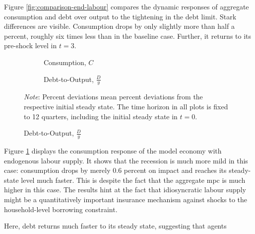 \documentclass[12pt]{article} %
\numberwithin{equation}{section} %
\numberwithin{figure}{section}
\numberwithin{table}{section}
\begin{document}
Figure \ref{fig:comparison-end-labour} compares the dynamic responses of aggregate consumption and debt over output to the tightening in the debt limit. Stark differences are visible. Consumption drops by only slightly more than half a percent, roughly six times less than in the baseline case. Further, it returns to its pre-shock level in $t=3$.

\begin{figure}[ht]
    \caption{Endogenous Labour Supply -- Shock to the Borrowing Limit: Aggregate Dynamics}
    \label{fig:comparison-end-labour}
    \centering
    \begin{subfigure}[b]{0.49\textwidth}
    \caption{Consumption, $C$}
    \label{fig:comparison-end-labour-c}
         \centering
         
     \end{subfigure}
     \hfill
    \begin{subfigure}[b]{0.49\textwidth}
    \caption{Debt-to-Output, $\frac{D}{y}$}
    \label{fig:comparison-end-labour-DY}
         \centering
         
     \end{subfigure}
     
     \vspace{10pt}
     
     \justifying
     \footnotesize
	\textit{Note}: Percent deviations mean percent deviations from the respective initial steady state. The time horizon in all plots is fixed to 12 quarters, including the initial steady state in $t=0$.
\end{figure}

Figure \ref{fig:comparison-end-labour-c} displays the consumption response of the model economy with endogenous labour supply. It shows that the recession is much more mild in this case: consumption drops by merely $0.6$ percent on impact and reaches its steady-state level much faster. This is despite the fact that the aggregate \Gls{mpc} is much higher in this case. The results hint at the fact that idiosyncratic labour supply might be a quantitatively important insurance mechanism against shocks to the household-level borrowing constraint.

Here, debt returns much faster to its steady state, suggesting that agents 
\end{document}
